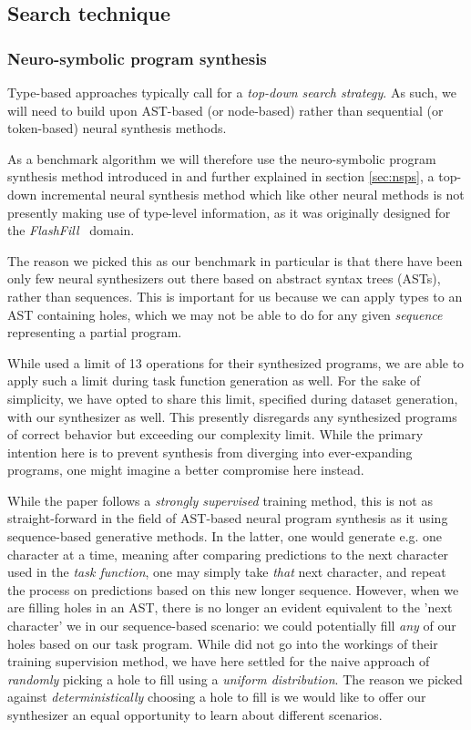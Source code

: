 \documentclass{article}
\begin{document}
\subsection{Search technique}

\subsubsection{Neuro-symbolic program synthesis}

Type-based approaches typically call for a \emph{top-down search strategy}.
As such, we will need to build upon AST-based (or node-based) rather than sequential (or token-based) neural synthesis methods.

As a benchmark algorithm we will therefore use the neuro-symbolic program synthesis method introduced in \citet{nsps} and further explained in section \ref{sec:nsps},
a top-down incremental neural synthesis method which like other neural methods is not presently making use of type-level information,
as it was originally designed for the \emph{FlashFill}~\citep{prose} domain.

The reason we picked this as our benchmark in particular is that there have been only few neural synthesizers out there based on abstract syntax trees (ASTs), rather than sequences.
This is important for us because we can apply types to an AST containing holes,
which we may not be able to do for any given \emph{sequence} representing a partial program.

While \citet{nsps} used a limit of 13 operations for their synthesized programs,
we are able to apply such a limit during task function generation as well.
For the sake of simplicity, we have opted to share this limit,
specified during dataset generation,
with our synthesizer as well.
This presently disregards any synthesized programs of
correct behavior but exceeding our complexity limit.
While the primary intention here is to prevent synthesis
from diverging into ever-expanding programs,
one might imagine a better compromise here instead.

While the paper follows a \emph{strongly supervised} training method,
this is not as straight-forward in the field of AST-based neural program synthesis as it using sequence-based generative methods.
In the latter, one would generate e.g. one character at a time,
meaning after comparing predictions to the next character used in the \emph{task function},
one may simply take \emph{that} next character,
and repeat the process on predictions based on this new longer sequence.
However, when we are filling holes in an AST,
there is no longer an evident equivalent to the 'next character' we in our sequence-based scenario:
we could potentially fill \emph{any} of our holes based on our task program.
While \citet{nsps} did not go into the workings of their training supervision method,
we have here settled for the naive approach of \emph{randomly} picking a hole to fill using a \emph{uniform distribution}.
The reason we picked against \emph{deterministically} choosing a hole to fill is
we would like to offer our synthesizer an equal opportunity to learn about different scenarios.
\end{document}
